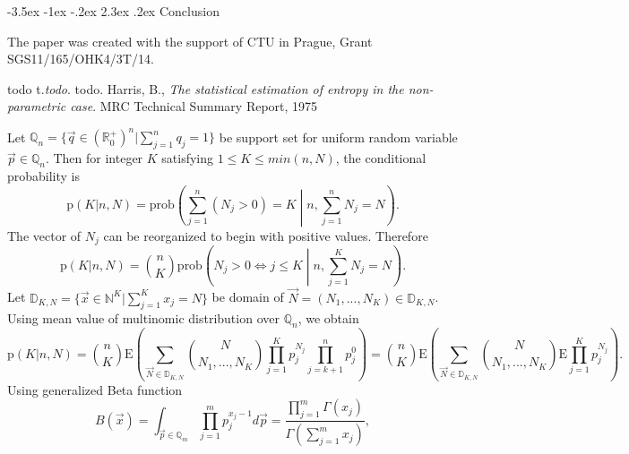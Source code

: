 \documentclass[a4paper,10pt]{article}
\makeatletter
\renewcommand\section{\@startsection {section}{1}{\z@}%
                                   {-3.5ex \@plus -1ex \@minus -.2ex}%
                                   {2.3ex \@plus.2ex}%
                                   {\large\bfseries}}
\makeatother
\begin{document}
\section {Conclusion }


\vspace*{10pt}  The paper was created with the support of CTU in Prague, Grant SGS11/165/OHK4/3T/14.

\begin{thebibliography}{99}
\vskip12pt
\label{bib1} todo t.\textit{todo}. todo.
\label{bib5} Harris, B., \textit{The statistical estimation of entropy in the non-parametric case}. MRC Technical Summary Report, 1975


\end{thebibliography}
\begin{appendices}
Let $\mathbb{Q}_{n} = \{ \vec{q} \in (\mathbb{R}_{0}^{+})^{n} | \sum_{j=1}^{n}q_{j} = 1 \}$ be support set for uniform random variable $\vec{p} \in \mathbb{Q}_{n}$. Then for integer $K$ satisfying $1 \le K \le min(n,N)$, the conditional probability is 
\begin{equation} 
\label{eq:probpkn}
\text{p}(K|n,N) = \text{prob}\left(\sum_{j=1}^{n}(N_{j} > 0) = K \middle| n, \sum_{j=1}^{n}N_{j} = N\right).
\end{equation}
The vector of $N_{j}$ can be reorganized to begin with positive values. Therefore
\begin{equation} 
\label{eq:probbinom}
\text{p}(K|n,N) = {n \choose K}\text{prob}\left(N_{j} > 0 \Leftrightarrow j \le K \middle| n, \sum_{j=1}^{K}N_{j}=N\right).
\end{equation}
Let $\mathbb{D}_{K,N} = \{ \vec{x} \in \mathbb{N}^K | \sum_{j=1}^{K}x_{j} = N \}$ be domain of $\vec{N} = (N_{1},...,N_{K}) \in \mathbb{D}_{K,N}$. Using mean value of multinomic distribution over $\mathbb{Q}_{n}$, we obtain
\begin{equation} 
\label{eq:probbinomexp}
\text{p}(K|n,N) = {n \choose K} \text{E}\left(\sum_{\vec{N} \in \mathbb{D}_{K,N}} {N \choose N_{1},...,N_{K}} \prod_{j=1}^{K}p_{j}^{N_{j}} \prod_{j=k+1}^{n}p_{j}^{0} \right) = {n \choose K} \text{E}\left(\sum_{\vec{N} \in \mathbb{D}_{K,N}} {N \choose N_{1},...,N_{K}} \text{E}\prod_{j=1}^{K}p_{j}^{N_{j}}\right).
\end{equation}
Using generalized Beta function
\begin{equation} 
\label{eq:betafce}
B(\vec{x}) = \int_{\vec{p} \in \mathbb{Q}_{m}} \prod_{j=1}^{m} p_{j}^{x_{j}-1} d\vec{p} = \frac{\prod_{j=1}^{m} \Gamma(x_{j})}{\Gamma(\sum_{j=1}^{m}x_{j})},

\end{equation}
\end{appendices}
\end{document}
